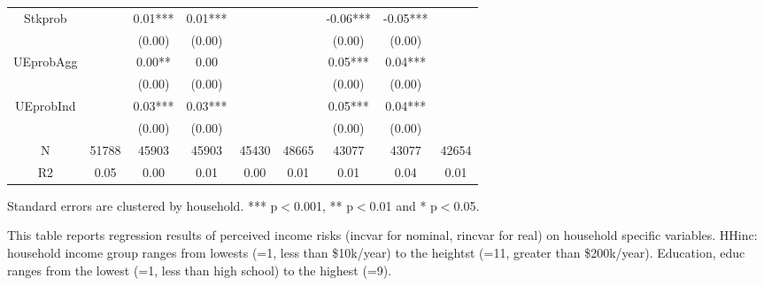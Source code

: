\documentclass[12pt,notitlepage,onecolumn,aps,pra]{article}
\begin{document}
\begin{table}[p]
\begin{adjustbox}{width=\textwidth}
\begin{threeparttable}
\begin{tabular}{ccccccccc}
Stkprob          &          &   0.01*** &    0.01*** &             &           &   -0.06*** &    -0.05*** &              \\
                 &          &    (0.00) &     (0.00) &             &           &     (0.00) &      (0.00) &              \\
UEprobAgg        &          &    0.00** &       0.00 &             &           &    0.05*** &     0.04*** &              \\
                 &          &    (0.00) &     (0.00) &             &           &     (0.00) &      (0.00) &              \\
UEprobInd        &          &   0.03*** &    0.03*** &             &           &    0.05*** &     0.04*** &              \\
                 &          &    (0.00) &     (0.00) &             &           &     (0.00) &      (0.00) &              \\
N                &    51788 &     45903 &      45903 &       45430 &     48665 &      43077 &       43077 &        42654 \\
R2               &     0.05 &      0.00 &       0.01 &        0.00 &      0.01 &       0.01 &        0.04 &         0.01 \\
\bottomrule
\end{tabular}
\begin{tablenotes}\item Standard errors are clustered by household. *** p$<$0.001, ** p$<$0.01 and * p$<$0.05. 
\item This table reports regression results of perceived income risks (incvar for nominal, rincvar for real) on household specific variables. HHinc: household income group ranges from lowests (=1, less than \$10k/year) to the heightst (=11, greater than \$200k/year). Education, educ ranges from the lowest (=1, less than high school) to the highest (=9).
\end{tablenotes}
\end{threeparttable}
\end{adjustbox}
\end{table}
\end{document}
